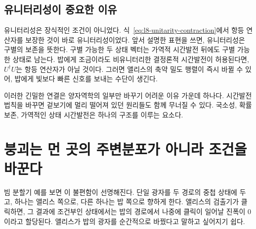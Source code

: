 \begin{classroomqa}
\end{classroomqa}

\subsection{유니터리성이 중요한 이유}

유니터리성은 장식적인 조건이 아니었다. 식~\eqref{eq:l8-unitarity-contraction}에서 항등 연산자를 보장한 것이 바로 유니터리성이었다. 앞서 설명한 표현을 쓰면, 유니터리성은 구별의 보존을 뜻한다. 구별 가능한 두 상태 벡터는 가역적 시간발전 뒤에도 구별 가능한 상태로 남는다. 밥에게 조금이라도 비유니터리한 결정론적 시간발전이 허용된다면, \(U^\dagger U\)는 항등 연산자가 아닐 것이다. 그러면 앨리스의 축약 밀도 행렬이 즉시 바뀔 수 있어, 밥에게 빛보다 빠른 신호를 보내는 수단이 생긴다.

이러한 긴밀한 연결은 양자역학의 일부만 바꾸기 어려운 이유 가운데 하나다. 시간발전 법칙을 바꾸면 겉보기에 멀리 떨어져 있던 원리들도 함께 무너질 수 있다. 국소성, 확률 보존, 가역적인 상태 시간발전은 하나의 구조를 이루는 요소다.

\begin{classroomqa}
\end{classroomqa}

\section{붕괴는 먼 곳의 주변분포가 아니라 조건을 바꾼다}

빔 분할기 예를 보면 이 불편함이 선명해진다. 단일 광자를 두 경로의 중첩 상태에 두고, 하나는 앨리스 쪽으로, 다른 하나는 밥 쪽으로 향하게 한다. 앨리스의 검출기가 클릭하면, 그 결과에 조건부인 상태에서는 밥의 경로에서 나중에 클릭이 일어날 진폭이 0이라고 할당된다. 앨리스가 밥의 광자를 순간적으로 바꿨다고 말하고 싶어지기 쉽다.

